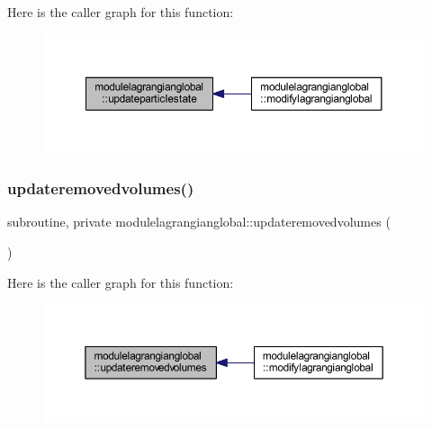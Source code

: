 Here is the caller graph for this function\+:\nopagebreak
\begin{figure}[H]
\begin{center}
\leavevmode
\includegraphics[width=350pt]{namespacemodulelagrangianglobal_ab509b6f03f7bc88920c0f876849e0b4e_icgraph}
\end{center}
\end{figure}
\mbox{\label{namespacemodulelagrangianglobal_a43b7c49b0fc50c80ec9c87139197e60b}} 
\subsubsection{\texorpdfstring{updateremovedvolumes()}{updateremovedvolumes()}}
{\footnotesize\ttfamily subroutine, private modulelagrangianglobal\+::updateremovedvolumes (\begin{DoxyParamCaption}{ }\end{DoxyParamCaption})\hspace{0.3cm}{\ttfamily [private]}}

Here is the caller graph for this function\+:\nopagebreak
\begin{figure}[H]
\begin{center}
\leavevmode
\includegraphics[width=350pt]{namespacemodulelagrangianglobal_a43b7c49b0fc50c80ec9c87139197e60b_icgraph}
\end{center}
\end{figure}
\mbox{\label{namespacemodulelagrangianglobal_aee31fff31d61d2bd1593396996588917}} 
